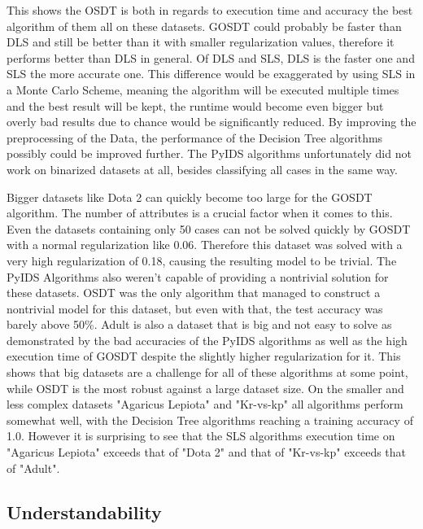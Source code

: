 \documentclass[a4paper,preprint]{sig-alternate-xt}
\begin{document}
This shows the OSDT is both in regards to execution time and accuracy the best algorithm of them all on these datasets. GOSDT could probably be faster than DLS and still be better than it with smaller regularization values, therefore it performs better than DLS in general. Of DLS and SLS, DLS is the faster one and SLS the more accurate one. This difference would be exaggerated by using SLS in a Monte Carlo Scheme, meaning the algorithm will be executed multiple times and the best result will be kept, the runtime would become even bigger but overly bad results due to chance would be significantly reduced.  
By improving the preprocessing of the Data, the performance  of the Decision Tree algorithms possibly could be improved further. The PyIDS algorithms unfortunately did not work on binarized datasets at all, besides classifying all cases in the same way. 


Bigger datasets like Dota 2 can quickly become too large for the GOSDT algorithm. The number of attributes is a crucial factor when it comes to this. Even the datasets containing only 50 cases can not be solved quickly by GOSDT with a normal regularization like 0.06. Therefore this dataset was solved with a very high regularization of 0.18, causing the resulting model to be trivial. The PyIDS Algorithms also weren't capable of providing a nontrivial solution for these datasets. OSDT was the only algorithm that managed to construct a nontrivial model for this dataset, but even with that, the test accuracy was barely above 50\%. Adult is also a dataset that is big and not easy to solve as demonstrated by the bad accuracies of the PyIDS algorithms as well as the high execution time of GOSDT despite the slightly higher regularization for it. This shows that big datasets are a challenge for all of these algorithms at some point, while OSDT is the most robust against a large dataset size. On the smaller and less complex datasets "Agaricus Lepiota" and "Kr-vs-kp" all algorithms perform somewhat well, with the Decision Tree algorithms reaching a training accuracy of 1.0. However it is surprising to see that the SLS algorithms execution time on "Agaricus Lepiota" exceeds that of "Dota 2" and that of "Kr-vs-kp" exceeds that of "Adult".

\subsection{Understandability}
\label{subsec:understandability}
\end{document}
